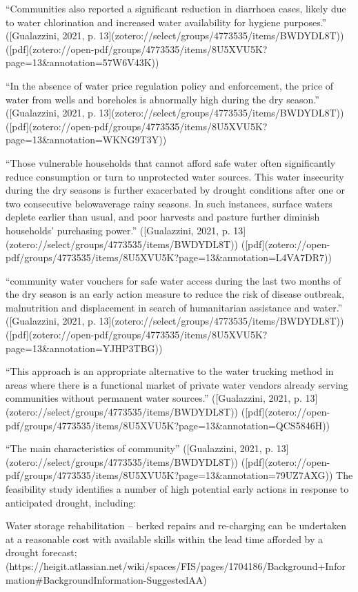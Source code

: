 {“Communities also reported a significant reduction in diarrhoea cases, likely due to water chlorination and increased water availability for hygiene purposes.” ([Gualazzini, 2021, p. 13](zotero://select/groups/4773535/items/BWDYDL8T)) ([pdf](zotero://open-pdf/groups/4773535/items/8U5XVU5K?page=13&annotation=57W6V43K))

“In the absence of water price regulation policy and enforcement, the price of water from wells and boreholes is abnormally high during the dry season.” ([Gualazzini, 2021, p. 13](zotero://select/groups/4773535/items/BWDYDL8T)) ([pdf](zotero://open-pdf/groups/4773535/items/8U5XVU5K?page=13&annotation=WKNG9T3Y))

“Those vulnerable households that cannot afford safe water often significantly reduce consumption or turn to unprotected water sources. This water insecurity during the dry seasons is further exacerbated by drought conditions after one or two consecutive belowaverage rainy seasons. In such instances, surface waters deplete earlier than usual, and poor harvests and pasture further diminish households’ purchasing power.” ([Gualazzini, 2021, p. 13](zotero://select/groups/4773535/items/BWDYDL8T)) ([pdf](zotero://open-pdf/groups/4773535/items/8U5XVU5K?page=13&annotation=L4VA7DR7))

“community water vouchers for safe water access during the last two months of the dry season is an early action measure to reduce the risk of disease outbreak, malnutrition and displacement in search of humanitarian assistance and water.” ([Gualazzini, 2021, p. 13](zotero://select/groups/4773535/items/BWDYDL8T)) ([pdf](zotero://open-pdf/groups/4773535/items/8U5XVU5K?page=13&annotation=YJHP3TBG))

“This approach is an appropriate alternative to the water trucking method in areas where there is a functional market of private water vendors already serving communities without permanent water sources.” ([Gualazzini, 2021, p. 13](zotero://select/groups/4773535/items/BWDYDL8T)) ([pdf](zotero://open-pdf/groups/4773535/items/8U5XVU5K?page=13&annotation=QCS5846H))

“The main characteristics of community” ([Gualazzini, 2021, p. 13](zotero://select/groups/4773535/items/BWDYDL8T)) ([pdf](zotero://open-pdf/groups/4773535/items/8U5XVU5K?page=13&annotation=79UZ7AXG))
The feasibility study identifies a number of high potential early actions in response to anticipated drought, including:

Water storage rehabilitation – berked repairs and re-charging can be undertaken at a reasonable cost with available skills within the lead time afforded by a drought forecast; (https://heigit.atlassian.net/wiki/spaces/FIS/pages/1704186/Background+Information#BackgroundInformation-SuggestedAA)

}
